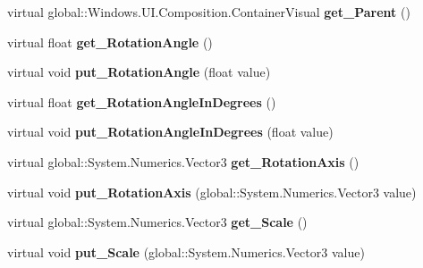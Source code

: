 \begin{DoxyCompactItemize}
virtual global\+::\+Windows.\+U\+I.\+Composition.\+Container\+Visual {\bfseries get\+\_\+\+Parent} ()
\item 
\mbox{\label{class_windows_1_1_u_i_1_1_composition_1_1_visual_a46a0e2c6f7487264a8eb1652dd8716e6}} 
virtual float {\bfseries get\+\_\+\+Rotation\+Angle} ()
\item 
\mbox{\label{class_windows_1_1_u_i_1_1_composition_1_1_visual_a912ec0e9a447786e1502e1290aeb7f59}} 
virtual void {\bfseries put\+\_\+\+Rotation\+Angle} (float value)
\item 
\mbox{\label{class_windows_1_1_u_i_1_1_composition_1_1_visual_a6afa235bbf0eda06c026297cadc1b005}} 
virtual float {\bfseries get\+\_\+\+Rotation\+Angle\+In\+Degrees} ()
\item 
\mbox{\label{class_windows_1_1_u_i_1_1_composition_1_1_visual_ab913ab76eea8338f04b946c0fa8e8df1}} 
virtual void {\bfseries put\+\_\+\+Rotation\+Angle\+In\+Degrees} (float value)
\item 
\mbox{\label{class_windows_1_1_u_i_1_1_composition_1_1_visual_ae2a10f0e80dbd715f4a46226c4e1c6c0}} 
virtual global\+::\+System.\+Numerics.\+Vector3 {\bfseries get\+\_\+\+Rotation\+Axis} ()
\item 
\mbox{\label{class_windows_1_1_u_i_1_1_composition_1_1_visual_a7205a644c2e54e0465bfc32dff2ba814}} 
virtual void {\bfseries put\+\_\+\+Rotation\+Axis} (global\+::\+System.\+Numerics.\+Vector3 value)
\item 
\mbox{\label{class_windows_1_1_u_i_1_1_composition_1_1_visual_a35b342e278a4e2eee8f7e447d88c1043}} 
virtual global\+::\+System.\+Numerics.\+Vector3 {\bfseries get\+\_\+\+Scale} ()
\item 
\mbox{\label{class_windows_1_1_u_i_1_1_composition_1_1_visual_a7d09090c17f01920bb97e02f119cc78f}} 
virtual void {\bfseries put\+\_\+\+Scale} (global\+::\+System.\+Numerics.\+Vector3 value)

\end{DoxyCompactItemize}
